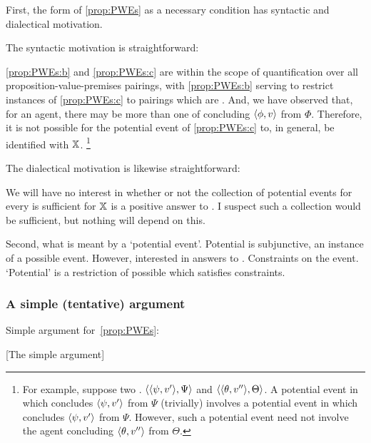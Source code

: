 \begin{note}
  First, the form of \autoref{prop:PWEs} as a necessary condition has syntactic and dialectical motivation.

  The syntactic motivation is straightforward:
  \begin{shiftpar}
    \ref{prop:PWEs:b} and \ref{prop:PWEs:c} are within the scope of quantification over all proposition-value-premises pairings, with \ref{prop:PWEs:b} serving to restrict instances of \ref{prop:PWEs:c} to pairings which are \requ{}.
    And, we have observed that, for an agent, there may be more than one \requ{} of concluding \(\pv{\phi}{v}\) from \(\Phi\).
    Therefore, it is not possible for the potential event of \ref{prop:PWEs:c} to, in general, be identified with \(\qzSaV{}\).%
    \footnote{
      For example, suppose two .
      \(\pvp{\psi}{v'}{\Psi}\) and \(\pvp{\theta}{v''}{\Theta}\).
      A potential event in which \vAgent{} concludes \(\pv{\psi}{v'}\) from \(\Psi\) (trivially) involves a potential event in which \vAgent{} concludes \(\pv{\psi}{v'}\) from \(\Psi\).
      However, such a potential event need not involve the agent concluding \(\pv{\theta}{v''}\) from \(\Theta\).
    }
  \end{shiftpar}

  The dialectical motivation is likewise straightforward:

  \begin{shiftpar}
    We will have no interest in whether or not the collection of potential events for every \requ{} is sufficient for \(\qzSaV{}\) is a positive answer to \qzS{}.
    I suspect such a collection would be sufficient, but nothing will depend on this.
  \end{shiftpar}
\end{note}

\begin{note}
  Second, what is meant by a `potential event'.
  Potential is subjunctive, an instance of a possible event.
  However, interested in answers to \qzS{}.
  Constraints on the event.
  `Potential' is a restriction of possible which satisfies constraints.
\end{note}

\subsubsection{A simple (tentative) argument}
\label{sec:simple-argument}

\begin{note}
  Simple argument for~\autoref{prop:PWEs}:

  [The simple argument]
\end{note}

